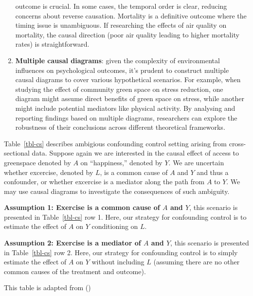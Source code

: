 \documentclass[
  singlecolumn]{article}
\begin{document}
\begin{enumerate}
  outcome is crucial. In some cases, the temporal order is clear,
  reducing concerns about reverse causation. Mortality is a definitive
  outcome where the timing issue is unambiguous. If researching the
  effects of air quality on mortality, the causal direction (poor air
  quality leading to higher mortality rates) is straightforward.
\item
  \textbf{Multiple causal diagrams}: given the complexity of
  environmental influences on psychological outcomes, it's prudent to
  construct multiple causal diagrams to cover various hypothetical
  scenarios. For example, when studying the effect of community green
  space on stress reduction, one diagram might assume direct benefits of
  green space on stress, while another might include potential mediators
  like physical activity. By analysing and reporting findings based on
  multiple diagrams, researchers can explore the robustness of their
  conclusions across different theoretical frameworks.
\end{enumerate}

Table~\ref{tbl-cs} describes ambigious confounding control setting
arising from cross-sectional data. Suppose again we are interested in
the causal effect of access to greenspace denoted by \(A\) on
``happiness,'' denoted by \(Y\). We are uncertain whether excercise,
denoted by \(L\), is a common cause of \(A\) and \(Y\) and thus a
confounder, or whether excercise is a mediator along the path from \(A\)
to \(Y\). We may use causal diagrams to investigate the consequences of
such ambiguity.

\textbf{Assumption 1: Exercise is a common cause of \(A\) and \(Y\)},
this scenario is presented in Table~\ref{tbl-cs} row 1. Here, our
strategy for confounding control is to estimate the effect of \(A\) on
\(Y\) conditioning on \(L\).

\textbf{Assumption 2: Exercise is a mediator of \(A\) and \(Y\)}, this
scenario is presented in Table~\ref{tbl-cs} row 2. Here, our strategy
for confounding control is to simply estimate the effect of \(A\) on
\(Y\) without including \(L\) (assuming there are no other common causes
of the treatment and outcome).

\begin{table}

\caption{\label{tbl-cs}This table is adapted from
()}

\centering{

\examplecrosssection

}

\end{table}%
\end{document}
